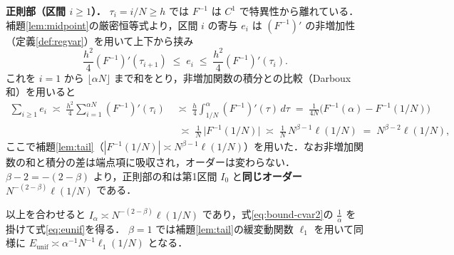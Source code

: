 \documentclass[a4paper,10pt]{jsarticle}
\makeatletter
\theoremstyle{definition}
\renewenvironment{proof}[1][\proofname]{\par
  \pushQED{\qed}%
  \normalfont \topsep6\p@\@plus6\p@\relax
  \trivlist
  \item[\hskip\labelsep\textbf{#1}]\ignorespaces
}{%
  \popQED\endtrivlist\@endpefalse
}
\renewcommand{\proofname}{証明}
\newcommand{\Finv}{F^{-1}}
\makeatother
\begin{document}
\begin{proof}
\noindent\textbf{正則部（区間 $i\ge1$）．}
$\tau_i=i/N\ge h$ では $\Finv$ は $C^1$ で特異性から離れている．補題\ref{lem:midpoint}の厳密恒等式より，区間 $i$ の寄与 $e_i$ は
$(\Finv)'$ の非増加性（定義\ref{def:regvar}）を用いて上下から挟み
\begin{equation*}
  \frac{h^2}{4}(\Finv)'(\tau_{i+1})\;\le\;e_i\;\le\;\frac{h^2}{4}(\Finv)'(\tau_i).
\end{equation*}
これを $i=1$ から $\lfloor\alpha N\rfloor$ まで和をとり，非増加関数の積分との比較（Darboux 和）を用いると
\begin{align*}
\sum_{i\ge1}e_i\;\asymp\;\frac{h^2}{4}\sum_{i=1}^{\alpha N}(\Finv)'(\tau_i)
\;&\asymp\;\frac{h}{4}\int_{1/N}^{\alpha}(\Finv)'(\tau)\,d\tau
\;=\;\frac1{4N}\bigl(\Finv(\alpha)-\Finv(1/N)\bigr)\\
&\;\asymp\;\frac1N\,\bigl|\Finv(1/N)\bigr|
\;\asymp\;\frac1N\,N^{\beta-1}\ell(1/N)
\;=\;N^{\beta-2}\ell(1/N),
\end{align*}
ここで補題\ref{lem:tail}（$|\Finv(1/N)|\asymp N^{\beta-1}\ell(1/N)$）を用いた．なお非増加関数の和と積分の差は端点項に吸収され，オーダーは変わらない．
$\beta-2=-(2-\beta)$ より，正則部の和は第1区間 $I_0$ と\textbf{同じオーダー} $N^{-(2-\beta)}\ell(1/N)$ である．

以上を合わせると $I_\alpha\asymp N^{-(2-\beta)}\ell(1/N)$ であり，式\eqref{eq:bound-cvar2}の $\frac1\alpha$ を掛けて式\eqref{eq:eunif}を得る．
$\beta=1$ では補題\ref{lem:tail}の緩変動関数 $\ell_1$ を用いて同様に $E_{\mathrm{unif}}\asymp\alpha^{-1}N^{-1}\ell_1(1/N)$ となる．
\end{proof}
\end{document}
